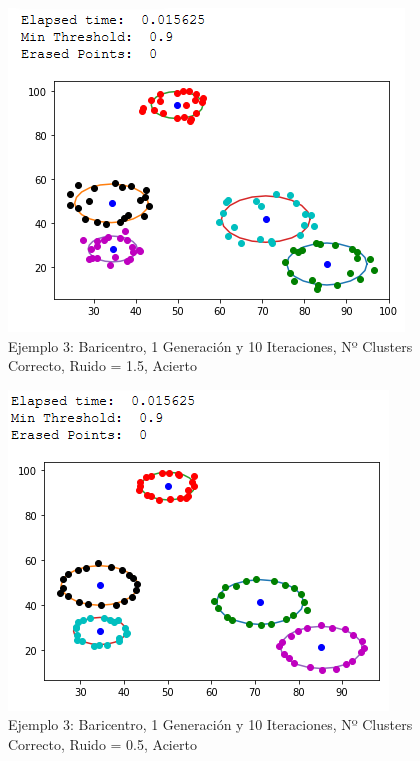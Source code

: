 \documentclass[conference,a4paper]{IEEEtran}
\begin{document}
\begin{figure}[H]
\centering
\includegraphics[scale=0.65]{Experimentacion/Ejemplo3/ej3_b_1_10_mr}
\caption{Ejemplo 3: Baricentro, 1 Generación y 10 Iteraciones,  Nº Clusters Correcto, Ruido = 1.5, Acierto\\}
\end{figure}

\begin{figure}[H]
\centering
\includegraphics[scale=0.65]{Experimentacion/Ejemplo3/ej3_b_1_10_lr_correct}
\caption{Ejemplo 3: Baricentro, 1 Generación y 10 Iteraciones,  Nº Clusters Correcto, Ruido = 0.5, Acierto\\}
\end{figure}
\end{document}
